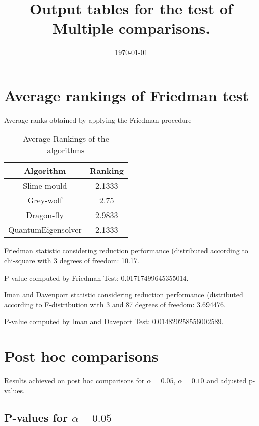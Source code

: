 \documentclass[a4paper,10pt]{article}
\title{Output tables for the test of Multiple comparisons.}
\author{}
\date{\today}
\begin{document}
\begin{landscape}
\pagestyle{empty}
\maketitle
\thispagestyle{empty}
\section{Average rankings of Friedman test}



Average ranks obtained by applying the Friedman procedure

\begin{table}[!htp]
\centering
\begin{tabular}{|c|c|}\hline
Algorithm&Ranking\\\hline
Slime-mould & 2.1333\\
Grey-wolf & 2.75\\
Dragon-fly & 2.9833\\
QuantumEigensolver & 2.1333\\
\hline
\end{tabular}
\caption{Average Rankings of the algorithms}
\end{table}

Friedman statistic considering reduction performance (distributed according to chi-square with 3 degrees of freedom: 10.17.

P-value computed by Friedman Test: 0.01717499645355014.\newline

Iman and Davenport statistic considering reduction performance (distributed according to F-distribution with 3 and 87 degrees of freedom: 3.694476.

P-value computed by Iman and Daveport Test: 0.014820258556002589.\newline



\pagebreak

\section{Post hoc comparisons}

Results achieved on post hoc comparisons for $\alpha = 0.05$, $\alpha = 0.10$ and adjusted p-values.

\subsection{P-values for $\alpha=0.05$}


\end{landscape}
\end{document}
